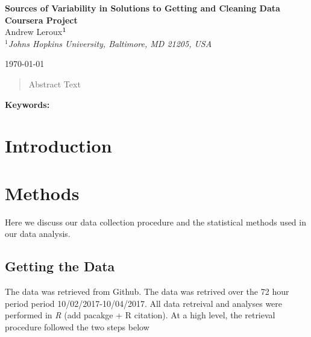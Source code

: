 \documentclass[12pt]{article}\usepackage[]{graphicx}\usepackage[]{color}
\begin{document}



\newif\ifblind
\newif\ifunblind
\unblindtrue

\begin{center}
{\large \bfseries Sources of Variability in Solutions to Getting and Cleaning Data Coursera Project}\\[2ex]
\ifblind Anonymous Authors \else {\normalsize {\sc Andrew Leroux$\null^{1}$}}\\[1ex]
{\it $^{1}$Johns Hopkins University, Baltimore, MD 21205, USA} \\
\vspace{.1in}
\fi
\end{center}

\centerline{\today}


\begin{abstract}

Abstract Text

\end{abstract}
\textbf{Keywords:} 






\section{Introduction}








\section{Methods}

Here we discuss our data collection procedure and the statistical methods used in our data analysis.



\subsection{Getting the Data}

The data was retrieved from Github. 
The data was retrived over the 72 hour period period 10/02/2017-10/04/2017.
All data retreival and analyses were performed in {\it R} ({\color{red}add pacakge + R citation}).
At a high level, the retrieval procedure followed the two steps below 
 
\end{document}
